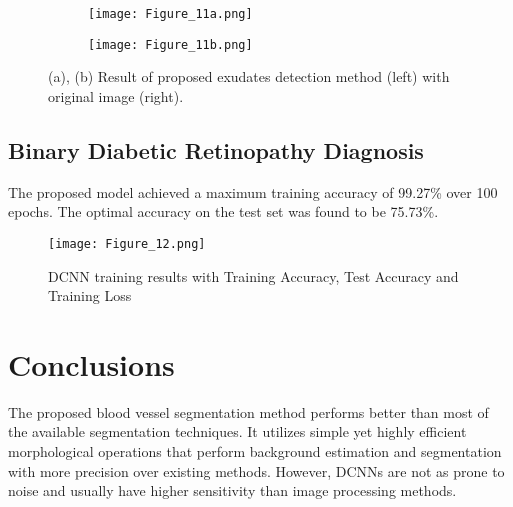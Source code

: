 \documentclass{svproc}
\begin{document}
\begin{figure}
     \centering
     \begin{subfigure}[b]{0.49\textwidth}
         \centering
         \texttt{[image: Figure\_11a.png]}
         \caption{}
         \label{fig: fig11a}
     \end{subfigure}
     \hfill
     \begin{subfigure}[b]{0.49\textwidth}
         \centering
         \texttt{[image: Figure\_11b.png]}
         \caption{}
         \label{fig: fig11b}
     \end{subfigure}
     \caption{(a), (b) Result of proposed exudates detection method (left) with original image (right).}
     \label{fig: fig11}
\end{figure}

\subsection{Binary Diabetic Retinopathy Diagnosis}

The proposed model achieved a maximum training accuracy of 99.27\% over 100 epochs. The optimal accuracy on the test set was found to be 75.73\%.


\begin{figure}
    \centering
    \texttt{[image: Figure\_12.png]}
    \caption{DCNN training results with Training Accuracy, Test Accuracy and Training Loss}
    \label{fig: fig12}
\end{figure}


\section{Conclusions}

The proposed blood vessel segmentation method performs better than most of the available segmentation techniques. It utilizes simple yet highly efficient morphological operations that perform background estimation and segmentation with more precision over existing methods. However, DCNNs are not as prone to noise and usually have higher sensitivity than image processing methods.
\end{document}
